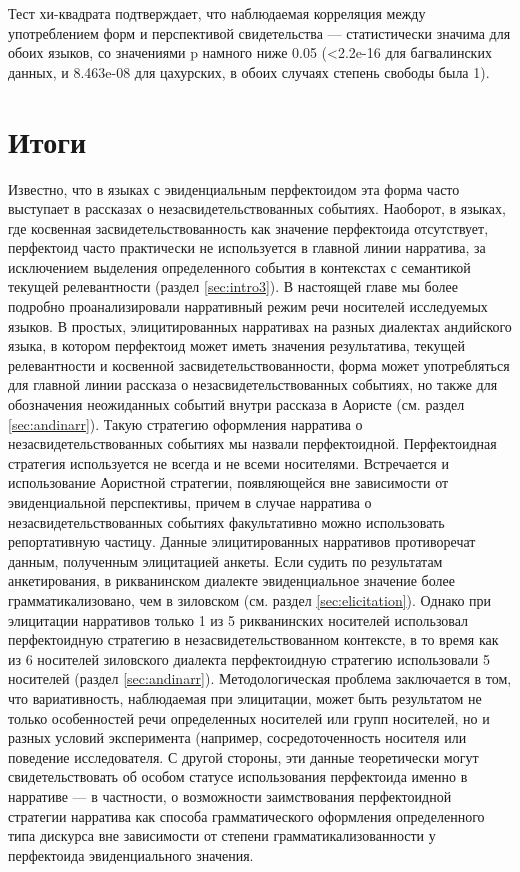 Тест хи-квадрата подтверждает, что наблюдаемая корреляция между употреблением форм и перспективой свидетельства — статистически значима для обоих языков, со значениями p намного ниже 0.05 (\textless 2.2e-16 для багвалинских данных, и 8.463e-08 для цахурских, в обоих случаях степень свободы была 1). 

\section{Итоги} \label{sec:itogi3}

Известно, что в языках с эвиденциальным перфектоидом эта форма часто выступает в рассказах о незасвидетельствованных событиях. Наоборот, в языках, где косвенная засвидетельствованность как значение перфектоида отсутствует, перфектоид часто практически не используется в главной линии нарратива, за исключением выделения определенного события в контекстах с семантикой текущей релевантности (раздел \ref{sec:intro3}). В настоящей главе мы более подробно проанализировали нарративный режим речи носителей исследуемых языков. В простых, элицитированных нарративах на разных диалектах андийского языка, в котором перфектоид может иметь значения результатива, текущей релевантности и косвенной засвидетельствованности, форма может употребляться для главной линии рассказа о незасвидетельствованных событиях, но также для обозначения неожиданных событий внутри рассказа в Аористе (см. раздел \ref{sec:andinarr}). Такую стратегию оформления нарратива о незасвидетельствованных событиях мы назвали перфектоидной. Перфектоидная стратегия используется не всегда и не всеми носителями. Встречается и использование Аористной стратегии, появляющейся вне зависимости от эвиденциальной перспективы, причем в случае нарратива о незасвидетельствованных событиях факультативно можно использовать репортативную частицу. Данные элицитированных нарративов противоречат данным, полученным элицитацией анкеты. Если судить по результатам анкетирования, в рикванинском диалекте эвиденциальное значение более грамматикализовано, чем в зиловском (см. раздел \ref{sec:elicitation}). Однако при элицитации нарративов только 1 из 5 рикванинских носителей использовал перфектоидную стратегию в незасвидетельствованном контексте, в то время как из 6 носителей зиловского диалекта перфектоидную стратегию использовали 5 носителей (раздел \ref{sec:andinarr}). Методологическая проблема заключается в том, что вариативность, наблюдаемая при элицитации, может быть результатом не только особенностей речи определенных носителей или групп носителей, но и разных условий эксперимента (например, сосредоточенность носителя или поведение исследователя. С другой стороны, эти данные теоретически могут свидетельствовать об особом статусе использования перфектоида именно в нарративе --- в частности, о возможности заимствования перфектоидной стратегии нарратива как способа грамматического оформления определенного типа дискурса вне зависимости от степени грамматикализованности у перфектоида эвиденциального значения.
